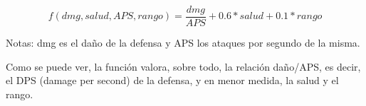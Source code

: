 $$ f(dmg, salud, APS, rango)=\frac{dmg}{APS} + 0.6 * salud + 0.1 * rango $$

Notas: dmg es el daño de la defensa y APS los ataques por segundo de la misma.

Como se puede ver, la función valora, sobre todo, la relación daño/APS, es decir, el DPS (damage per second) de la defensa, y en menor medida, la salud y el rango.
